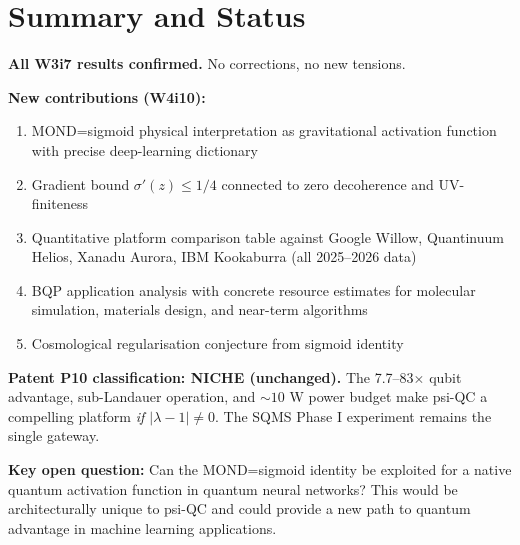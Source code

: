 \documentclass[11pt]{article}
\theoremstyle{definition}
\theoremstyle{remark}
\begin{document}
\section{Summary and Status}
\label{sec:summary}

\begin{tcolorbox}[colback=green!5!white, colframe=green!50!black,
  title=\textbf{W4i10 P10 Status Summary}]

\textbf{All W3i7 results confirmed.} No corrections, no new tensions.

\textbf{New contributions (W4i10):}
\begin{enumerate}[nosep]
\item MOND=sigmoid physical interpretation as gravitational activation
  function with precise deep-learning dictionary
\item Gradient bound $\sigma'(z) \leq 1/4$ connected to zero
  decoherence and UV-finiteness
\item Quantitative platform comparison table against Google Willow,
  Quantinuum Helios, Xanadu Aurora, IBM Kookaburra (all 2025--2026 data)
\item BQP application analysis with concrete resource estimates for
  molecular simulation, materials design, and near-term algorithms
\item Cosmological regularisation conjecture from sigmoid identity

\end{enumerate}

\textbf{Patent P10 classification: NICHE (unchanged).}
The 7.7--83$\times$ qubit advantage, sub-Landauer operation, and
$\sim 10$ W power budget make psi-QC a compelling platform
\emph{if $|\lambda-1| \neq 0$}. The SQMS Phase I experiment remains
the single gateway.

\textbf{Key open question:} Can the MOND=sigmoid identity be exploited
for a native quantum activation function in quantum neural networks?
This would be architecturally unique to psi-QC and could provide a
new path to quantum advantage in machine learning applications.
\end{tcolorbox}
\end{document}
